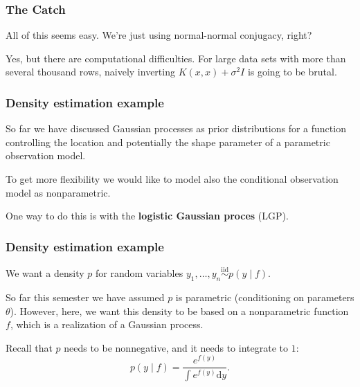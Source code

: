 \documentclass{beamer}
\begin{document}
\begin{frame}
\frametitle{The Catch}

All of this seems easy. We're just using normal-normal conjugacy, right?
\newline
\pause

Yes, but there are computational difficulties. For large data sets with more than several thousand rows, naively inverting $K(x,x) + \sigma^2I$ is going to be brutal.

\end{frame}

\begin{frame}
\frametitle{Density estimation example}

So far we have discussed Gaussian processes as prior distributions for a function controlling
the location and potentially the shape parameter of a parametric observation model. 
\pause
\newline


To get more flexibility we would like to model also the conditional observation model as nonparametric.
\newline

One way to do this is with the {\bf logistic Gaussian proces} (LGP).
\end{frame}


\begin{frame}
\frametitle{Density estimation example}

We want a density $p$ for random variables $y_1, \ldots, y_n \overset{\text{iid}}{\sim} p(y \mid f)$. 
\newline

So far this semester we have assumed $p$ is parametric (conditioning on parameters $\theta$). However, here, we want this density to be based on a nonparametric function $f$, which is a realization of a Gaussian process.
\newline
\pause

Recall that $p$ needs to be nonnegative, and it needs to integrate to $1$:
$$
p(y \mid f) = \frac{e^{f(y)} }{ \int e^{f(y)} \text{d}y }.
$$

\end{frame}
\end{document}
